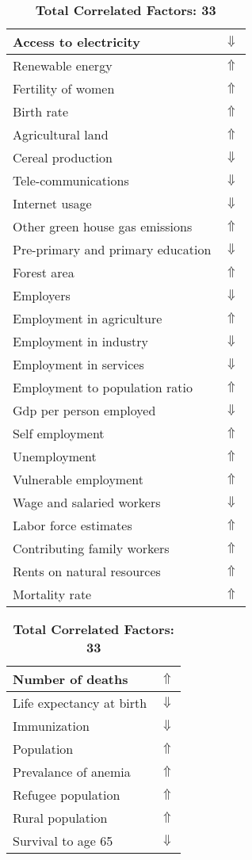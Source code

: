 \documentclass[12pt,notitlepage,oneside]{report}
\begin{document}
\begin{table}[!htb]
\caption{\textbf{Is Carried By: Rabbits hares $\Uparrow$}}
\centering
\label{Correlated Socio-economic Factors0}
\begin{tabular}{|l|l|}
\hline
Access to electricity & $\Downarrow$\\ \hline
Renewable energy & $\Uparrow$\\ \hline
Fertility of women & $\Uparrow$\\ \hline
Birth rate & $\Uparrow$\\ \hline
Agricultural land & $\Uparrow$\\ \hline
Cereal production & $\Downarrow$\\ \hline
Tele-communications & $\Downarrow$\\ \hline
Internet usage & $\Downarrow$\\ \hline
Other green house gas emissions & $\Uparrow$\\ \hline
Pre-primary and primary education & $\Downarrow$\\ \hline
Forest area & $\Uparrow$\\ \hline
Employers & $\Downarrow$\\ \hline
Employment in agriculture & $\Uparrow$\\ \hline
Employment in industry & $\Downarrow$\\ \hline
Employment in services & $\Downarrow$\\ \hline
Employment to population ratio & $\Uparrow$\\ \hline
Gdp per person employed & $\Downarrow$\\ \hline
Self employment & $\Uparrow$\\ \hline
Unemployment & $\Uparrow$\\ \hline
Vulnerable employment & $\Uparrow$\\ \hline
Wage and salaried workers & $\Downarrow$\\ \hline
Labor force estimates & $\Uparrow$\\ \hline
Contributing family workers & $\Uparrow$\\ \hline
Rents on natural resources & $\Uparrow$\\ \hline
Mortality rate & $\Uparrow$\\ \hline
\end{tabular}
\begin{tabular}{|l|l|}
\hline
Number of deaths & $\Uparrow$\\ \hline
Life expectancy at birth & $\Downarrow$\\ \hline
Immunization & $\Downarrow$\\ \hline
Population & $\Uparrow$\\ \hline
Prevalance of anemia & $\Uparrow$\\ \hline
Refugee population & $\Uparrow$\\ \hline
Rural population & $\Uparrow$\\ \hline
Survival to age 65 & $\Downarrow$\\ \hline
\end{tabular}
\caption*{\textbf{Total Correlated Factors: 33}}
\end{table}
\end{document}
